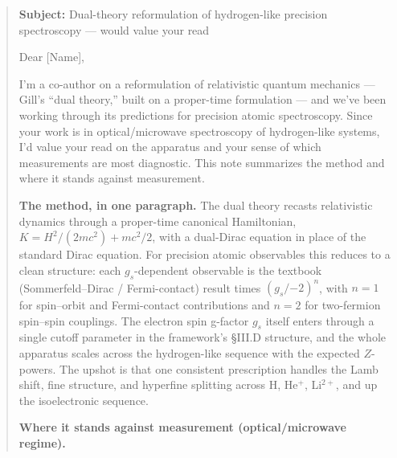 \documentclass[
  11pt,
]{article}
\begin{document}
\begin{quote}
\textbf{Subject:} Dual-theory reformulation of hydrogen-like precision
spectroscopy --- would value your read

Dear {[}Name{]},

I'm a co-author on a reformulation of relativistic quantum mechanics ---
Gill's ``dual theory,'' built on a proper-time formulation --- and we've
been working through its predictions for precision atomic spectroscopy.
Since your work is in optical/microwave spectroscopy of hydrogen-like
systems, I'd value your read on the apparatus and your sense of which
measurements are most diagnostic. This note summarizes the method and
where it stands against measurement.

\textbf{The method, in one paragraph.} The dual theory recasts
relativistic dynamics through a proper-time canonical Hamiltonian,
\(K = H^2/(2mc^2) + mc^2/2\), with a dual-Dirac equation in place of the
standard Dirac equation. For precision atomic observables this reduces
to a clean structure: each \(g_s\)-dependent observable is the textbook
(Sommerfeld--Dirac / Fermi-contact) result times \((g_s/{-2})^{n}\),
with \(n=1\) for spin--orbit and Fermi-contact contributions and \(n=2\)
for two-fermion spin--spin couplings. The electron spin g-factor \(g_s\)
itself enters through a single cutoff parameter in the framework's
§III.D structure, and the whole apparatus scales across the
hydrogen-like sequence with the expected \(Z\)-powers. The upshot is
that one consistent prescription handles the Lamb shift, fine structure,
and hyperfine splitting across H, He\(^{+}\), Li\(^{2+}\), and up the
isoelectronic sequence.

\textbf{Where it stands against measurement (optical/microwave regime).}


\end{quote}
\end{document}
